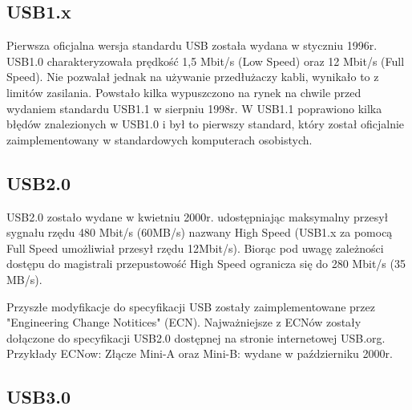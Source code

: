 \documentclass{BscUS}
\begin{document}
\subsection{USB1.x}
Pierwsza oficjalna wersja standardu USB została wydana w styczniu 1996r. USB1.0 charakteryzowała prędkość 1,5 Mbit/s (Low Speed) oraz 12 Mbit/s (Full Speed). Nie pozwalał jednak na używanie przedłużaczy kabli, wynikało to z limitów zasilania. %
Powstało kilka wypuszczono na rynek na chwile przed wydaniem standardu USB1.1 w sierpniu 1998r. W USB1.1 poprawiono kilka błędów znalezionych w USB1.0 i był to pierwszy standard, który został oficjalnie zaimplementowany w standardowych komputerach osobistych. \cite{USBSystemArch}

\subsection{USB2.0}
USB2.0 zostało wydane w kwietniu 2000r. udostępniając maksymalny przesył sygnału rzędu 480 Mbit/s (60MB/s) nazwany High Speed (USB1.x za pomocą Full Speed umożliwiał przesył rzędu 12Mbit/s). Biorąc pod uwagę zależności dostępu do magistrali przepustowość High Speed ogranicza się do 280 Mbit/s (35 MB/s).


Przyszłe modyfikacje do specyfikacji USB zostały zaimplementowane przez "Engineering Change Notitices" (ECN). Najważniejsze z ECNów zostały dołączone do specyfikacji USB2.0 dostępnej na stronie internetowej USB.org.
\newline
Przykłady ECNow:
\newline
Złącze Mini-A oraz Mini-B: wydane w październiku 2000r.
\newline
\cite{USB20Doc}


\subsection{USB3.0}
\end{document}
